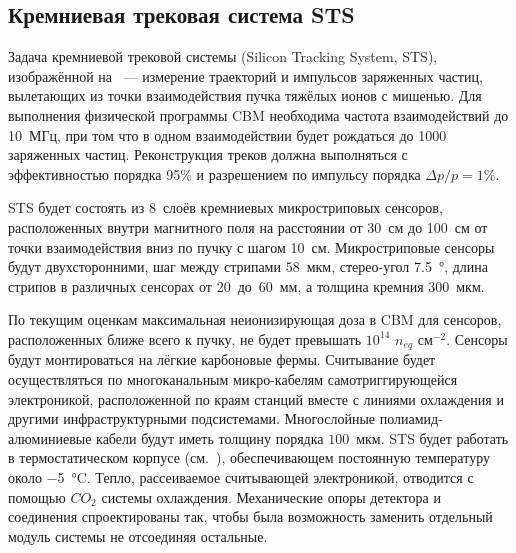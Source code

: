 \subsection{Кремниевая трековая система STS}\label{sec:secSTS}


Задача кремниевой трековой системы (Silicon Tracking System, STS), изображённой на~ --- измерение траекторий и импульсов заряженных частиц, вылетающих из точки взаимодействия пучка тяжёлых ионов с мишенью. Для выполнения физической программы CBM необходима частота взаимодействий до 10~МГц, при том что в одном взаимодействии будет рождаться до 1000 заряженных частиц. Реконструкция треков должна выполняться с эффективностью порядка 95\% и разрешением по импульсу порядка $\Delta p / p = 1\%$.


STS будет состоять из 8~слоёв кремниевых микростриповых сенсоров, расположенных внутри магнитного поля на расстоянии от 30~см до 100~см от точки взаимодействия вниз по пучку с шагом 10~см.
Микростриповые сенсоры будут двухсторонними, шаг между стрипами $58$~мкм, стерео-угол \SI{7.5}{\degree}, длина стрипов в различных сенсорах от 20~до~60~мм, а толщина кремния $300$~мкм.

По текущим оценкам максимальная неионизирующая доза в CBM для сенсоров, расположенных ближе всего к пучку, не будет превышать $10^{14}$ $n_{eq}$ см$^{-2}$.
Сенсоры будут монтироваться на лёгкие карбоновые фермы. Считывание будет осуществляться по многоканальным микро-кабелям самотриггирующейся электроникой, расположенной по краям станций вместе с линиями охлаждения и другими инфраструктурными подсистемами.
Многослойные полиамид-алюминиевые кабели будут иметь толщину порядка $100$~мкм.
STS будет работать в термостатическом корпусе (см.~), обеспечивающем постоянную температуру около \SI{-5}{\degreeCelsius}. Тепло, рассеиваемое считывающей электроникой, отводится с помощью $CO_{2}$ системы охлаждения. Механические опоры детектора и соединения спроектированы так, чтобы была возможность заменить отдельный модуль системы не отсоединяя остальные.

